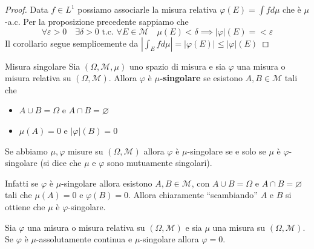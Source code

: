 \begin{proof}
    Data \(f \in L^{1}\) possiamo associarle la misura relativa \(\varphi(E) =
    \int f d\mu\) che è \(\mu\)-a.c. Per la proposizione precedente sappiamo che
    \[
        \forall \varepsilon > 0 \quad \exists \delta > 0 \text{ t.c. } \forall E
        \in \mathcal{M} \quad \mu(E) < \delta \implies |\varphi|(E) = <
        \varepsilon
    \]
    Il corollario segue semplicemente da \( \left| \int_E f d\mu\right| =
    |\varphi(E)| \le |\varphi |(E) \) 
\end{proof}
\begin{definition}{Misura singolare}
    Sia \((\Omega, \mathcal{M}, \mu)\) uno spazio di misura e sia \(\varphi\)
    una misura o misura relativa su \((\Omega, \mathcal{M})\). Allora
    \(\varphi\) è \textbf{\(\mu\)-singolare} se esistono \(A, B \in
    \mathcal{M}\) tali che 
\begin{itemize}[label = --]
    \item \(A \cup B = \Omega\) e \(A \cap B = \varnothing\) 
    \item \(\mu(A) = 0\) e \(|\varphi |(B) = 0\) 
\end{itemize}
\end{definition}
\begin{remark}
    Se abbiamo \(\mu, \varphi \) misure su \((\Omega, \mathcal{M})\) allora
    \(\varphi \) è \(\mu\)-singolare se e solo se \(\mu\) è
    \(\varphi \)-singolare (si dice che \(\mu\) e \(\varphi\) sono mutuamente singolari).

    Infatti se \(\varphi \) è \(\mu\)-singolare allora esistono \(A, B \in
    \mathcal{M}\), con \(A\cup B =\Omega\) e \(A \cap B = \varnothing\)  tali
    che \(\mu(A) = 0\) e \(\varphi(B) = 0\). Allora chiaramente ``scambiando''
    \(A\) e \(B\) si ottiene che \(\mu\) è \(\varphi\)-singolare.
\end{remark}
\begin{proposition}
    Sia \(\varphi \) una misura o misura relativa su \((\Omega, \mathcal{M})\)
    e sia \(\mu\) una misura su \((\Omega, \mathcal{M})\). Se \(\varphi \) è
    \(\mu\)-assolutamente continua e \(\mu\)-singolare allora \(\varphi = 0\).
\end{proposition}
